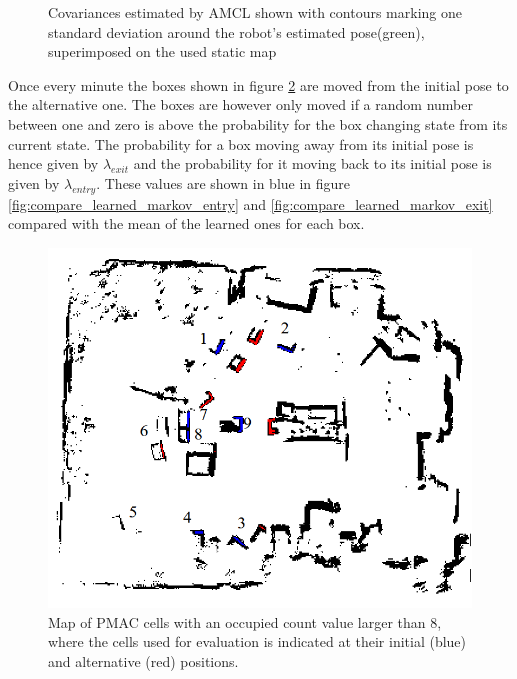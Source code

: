 \begin{figure}[htbp]
    \caption{Covariances estimated by AMCL shown with contours marking one standard deviation around the robot's estimated pose(green), superimposed on the used static map}
    \label{fig:flexlab_path_with_covariance_with_cleaned_map}
\end{figure}

Once every minute the boxes shown in figure \ref{fig:cells_used_for_evaluation_with_identification} are moved from  the initial pose to the alternative one. 
The boxes are however only moved if a random number between one and zero is above the probability for the box changing state from its current state.
The probability for a box moving away from its initial pose is hence given by $\lambda_{exit}$ and the probability for it moving back to its initial pose is given by $\lambda_{entry}$.
These values are shown in blue in figure \ref{fig:compare_learned_markov_entry} and \ref{fig:compare_learned_markov_exit} compared with the mean of the learned ones for each box.


\begin{figure}
    \centering
    \includegraphics[scale=0.6]{chapters/evaluation/figures/cells_used_for_evaluation_with_identification}
    \caption{Map of PMAC cells with an occupied count value larger than $8$, where the cells used for evaluation is indicated at their initial (blue) and alternative (red) positions.}
    \label{fig:cells_used_for_evaluation_with_identification}
\end{figure}

